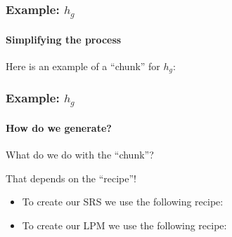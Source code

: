 \documentclass{beamer}
\begin{document}
\begin{frame}

\frametitle{Example: $h_g$}

\framesubtitle{Simplifying the process}

Here is an example of a ``chunk'' for $h_g$:


\end{frame}


\begin{frame}

\frametitle{Example: $h_g$}

\framesubtitle{How do we generate?}
What do we do with the ``chunk''?

That depends on the ``recipe''!

\begin{itemize}
\item To create our SRS we use the following recipe:
\end{itemize}


\begin{itemize}
\item To create our LPM we use the following recipe:
\end{itemize}


\end{frame}

\end{document}
